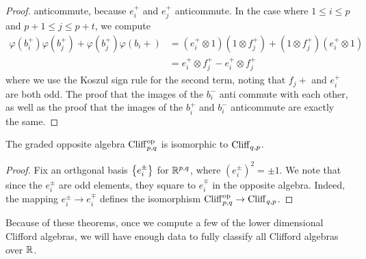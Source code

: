 \begin{proof}
anticommute, because $e_i^+$ and $e_j^+$ anticommute. In the case where
$1 \leq i \leq p$ and $p+1 \leq j \leq p+t$, we compute
%
\begin{align*}
\varphi(b_i^+)\varphi(b_j^+) + \varphi(b_j^+)\varphi(b_i+) &=
(e_i^+ \otimes 1)(1 \otimes f_j^+) + (1\otimes f_j^+)(e_i^+ \otimes 1) \\
&= e_i^+ \otimes f_j^+ - e_i^+ \otimes f_j^+
\end{align*}
where we use the Koszul sign rule for the second term, noting that $f_j+$ and
$e_i^+$ are both odd. The proof that the images of the $b_i^-$ anti commute with
each other, as well as the proof that the images of the $b_i^+$ and $b_i^-$
anticommute are exactly the same.
%
\end{proof}
%
\begin{thm}
The graded opposite algebra $\operatorname{Cliff}_{p,q}^{\text{op}}$ is isomorphic to
$\operatorname{Cliff}_{q,p}$.
\end{thm}
%
\begin{proof}
Fix an orthgonal basis $\left\lbrace e_i^\pm \right\rbrace$ for $\mathbb{R}^{p,q}$, where
$(e_i^\pm)^2 = \pm 1$. We note that since the $e_i^\pm$ are odd elements,
they square to $e_i^\mp$ in the opposite algebra. Indeed, the mapping
$e_i^\pm \to e_i^\mp$ defines the isomorphism
$\operatorname{Cliff}_{p,q}^\text{op} \to \operatorname{Cliff}_{q,p}$.
\end{proof}
%
Because of these theorems, once we compute a few of the lower dimensional
Clifford algebras, we will have enough data to fully classify all Clifford
algebras over $\mathbb{R}$.
%
